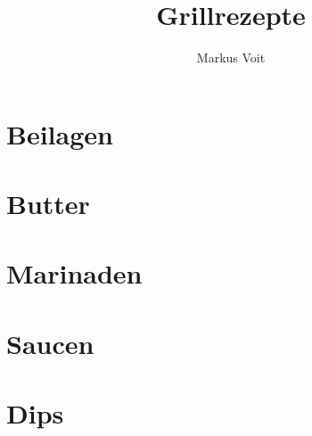 \documentclass[
  DIV=11,%
  pagesize,%
  fontsize=11pt,%
  paper=a4,%
  numbers=noenddot,
]{scrartcl}
\title{Grillrezepte}
\author{Markus Voit}
\begin{document}
\maketitle

\tableofcontents
\clearpage

\section{Beilagen}
\newpage{}
\newpage{}
\newpage{}

\section{Butter}
\newpage{}
\newpage{}
\newpage{}
\newpage{}
\newpage{}

\section{Marinaden}
\newpage{}
\newpage{}
\newpage{}

\section{Saucen}
\newpage{}
\newpage{}
\newpage{}
\newpage{}
\newpage{}
\newpage{}
\newpage{}

\section{Dips}
\newpage{}
\newpage{}
\end{document}
